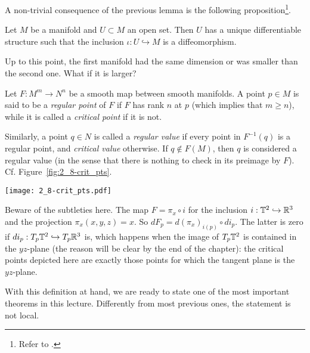 A non-trivial consequence of the previous lemma is the following proposition\footnote{Refer to \cite[Proposition 5.8 and Proposition 5.31]{book:lee}.}.

\begin{proposition}\label{prop:uniqdiffeoinclusion}
  Let $M$ be a manifold and $U\subset M$ an open set.
  Then $U$ has a unique differentiable structure such that the inclusion $\iota:U\hookrightarrow M$ is a diffeomorphism.
\end{proposition}

Up to this point, the first manifold had the same dimension or was smaller than the second one.
What if it is larger?

\begin{definition}
  Let $F:M^m \to N^n$ be a smooth map between smooth manifolds.
  A point $p\in M$ is said to be a \emph{regular point} of $F$ if $F$ has rank $n$ at $p$ (which implies that $m\geq n$), while it is called a \emph{critical point} if it is not.

  Similarly, a point $q\in N$ is called a \emph{regular value} if every point in $F^{-1}(q)$ is a regular point, and \emph{critical value} otherwise. If $q\not\in F(M)$, then $q$ is considered a regular value (in the sense that there is nothing to check in its preimage by $F$).
  Cf. Figure~\ref{fig:2_8-crit_pts}.
\end{definition}
\begin{marginfigure}[12em]
  \texttt{[image: 2\_8-crit\_pts.pdf]}
  \caption{Beware of the subtleties here. The map $F=\pi_x\circ i$ for the inclusion $i:\mathbb{T}^2\hookrightarrow\mathbb{R}^3$ and the projection $\pi_x(x,y,z)=x$.
  So $dF_p = d (\pi_x)_{i(p)} \circ d i_p$. The latter is zero if $d i_p: T_p\mathbb{T}^2\hookrightarrow T_p\mathbb{R}^3$ is, which happens when the image of $T_p\mathbb{T}^2$ is contained in the $yz$-plane (the reason will be clear by the end of the chapter): the critical points depicted here are exactly those points for which the tangent plane is the $yz$-plane.}
  \label{fig:2_8-crit_pts}
\end{marginfigure}

With this definition at hand, we are ready to state one of the most important theorems in this lecture. Differently from most previous ones, the statement is not local.

